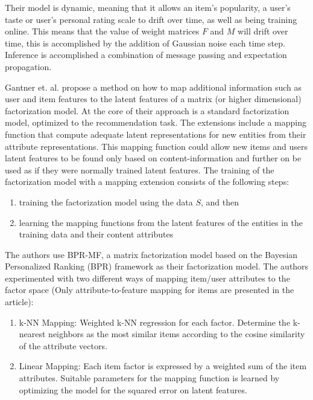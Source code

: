 Their model is dynamic, meaning that it allows an item's popularity, a user's taste or user's personal rating scale to drift over time, as well as being training online. This means that the value of weight matrices $F$ and $M$ will drift over time, this is accomplished by the addition of Gaussian noise each time step. Inference is accomplished a combination of message passing and expectation propagation.


Gantner et. al. \cite{Ganter2010} propose a method on how to map additional
information such as user and item features to the latent features of a matrix
(or higher dimensional) factorization model. At the core of their approach is a
standard factorization model, optimized to the recommendation task. The
extensions include a mapping function that compute adequate latent
representations for new entities from their attribute representations. This
mapping function could allow new items and users latent features to be found
only based on content-information and further on be used as if they were
normally trained latent features. The training of the factorization model with
a mapping extension consists of the following steps:

\begin{enumerate}
\item training the factorization model using the data $S$, and then
\item learning the mapping functions from the latent features of the entities in the training data and their content attributes
\end{enumerate}

The authors use BPR-MF, a matrix factorization model based on the Bayesian Personalized Ranking (BPR) framework as their factorization model. The authors experimented with two different ways of mapping item/user attributes to the factor space (Only attribute-to-feature mapping for items are presented in the article):

\begin{enumerate}
\item k-NN Mapping:	Weighted k-NN regression for each factor. Determine the k-nearest neighbors as the most similar items according to the cosine similarity of the attribute vectors.
\item Linear Mapping: Each item factor is expressed by a weighted sum of the item attributes. Suitable parameters for the mapping function is learned by optimizing the model for the squared error on latent features.
\end{enumerate}

